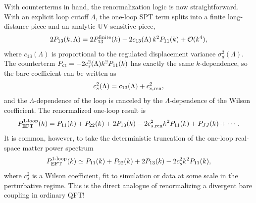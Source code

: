 With counterterms in hand, the renormalization logic is now straightforward. With an explicit loop cutoff $\Lambda$, the one-loop SPT term splits into a finite 
long-distance piece and an analytic UV-sensitive piece,
\begin{equation}
    2P_{13}(k,\Lambda)
    =2P_{13}^{\rm finite}(k)
    -2c_{13}(\Lambda)\,k^2P_{11}(k)
    +\mathcal{O}(k^4),
\end{equation}
where $c_{13}(\Lambda)$ is proportional to the regulated displacement 
variance $\sigma_d^2(\Lambda)$. The counterterm 
$P_{\rm ct}=-2c_s^2(\Lambda)k^2P_{11}(k)$ has exactly the same 
$k$-dependence, so the bare coefficient can be written as
\begin{equation}
    c_s^2(\Lambda)=c_{13}(\Lambda)+c_{s,{\rm ren}}^2,
\end{equation}
and the $\Lambda$-dependence of the loop is canceled by the 
$\Lambda$-dependence of the Wilson coefficient. The renormalized 
one-loop result is
\begin{equation}
    P_{\rm EFT}^{\rm 1\text{-}loop}(k)=
    P_{11}(k)+P_{22}(k)+2P_{13}(k)
    -2c_{s,{\rm ren}}^2 k^2 P_{11}(k)+P_{JJ}(k)+\cdots.
\end{equation}
It is common, however, to take the deterministic truncation of the one-loop real-space matter power spectrum
\begin{equation}
    P_{\rm EFT}^{\rm 1\text{-}loop}(k)\simeq
    P_{11}(k)+P_{22}(k)+2P_{13}(k)-2c_s^2 k^2 P_{11}(k),
\end{equation}
where $c_s^2$ is a Wilson coefficient, fit to simulation or data at some scale in the perturbative regime. This is the direct analogue of renormalizing a divergent bare coupling in ordinary QFT! \citep{CarrascoEtAl2012,PajerZaldarriaga2013,SchwartzQFT,Baldauf2020}
